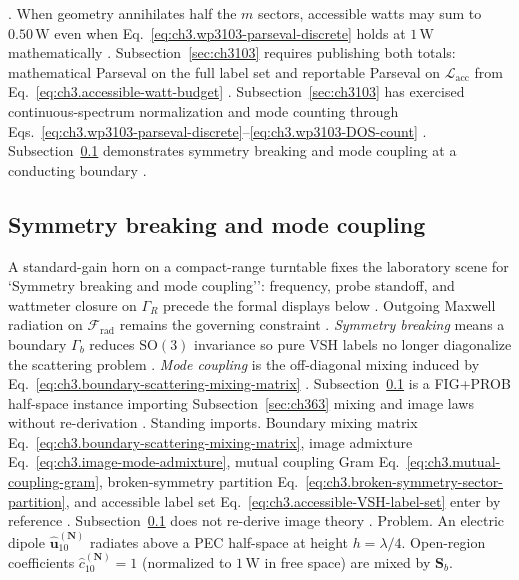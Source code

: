 \cite{hansen1988}.
When geometry annihilates half the \(m\) sectors, accessible watts may sum to \(0.50\,\mathrm{W}\) even when Eq.~\eqref{eq:ch3.wp3103-parseval-discrete} holds at \(1\,\mathrm{W}\) mathematically
\cite{harrington2001}. Subsection~\ref{sec:ch3103} requires publishing both totals: mathematical Parseval on the full label set and reportable Parseval on \(\mathcal{L}_{\mathrm{acc}}\) from Eq.~\eqref{eq:ch3.accessible-watt-budget}
\cite{hansen1988}.
Subsection~\ref{sec:ch3103} has exercised continuous-spectrum normalization and mode counting through
Eqs.~\eqref{eq:ch3.wp3103-parseval-discrete}--\eqref{eq:ch3.wp3103-DOS-count}
\cite{stratton1941}. Subsection~\ref{sec:ch3104} demonstrates symmetry breaking and mode coupling at a conducting
boundary \cite{jackson1999}.
\subsection{Symmetry breaking and mode coupling}
\label{sec:ch3104}
A standard-gain horn on a compact-range turntable fixes the laboratory scene for `Symmetry breaking and mode coupling'': frequency, probe standoff, and wattmeter closure on $\Gamma_R$ precede the formal displays below \cite{hansen1988}. Outgoing Maxwell radiation on $\mathcal{F}_{\mathrm{rad}}$ remains the governing constraint \cite{stratton1941}.
\emph{Symmetry breaking} means a boundary \(\Gamma_{b}\) reduces \(\mathrm{SO}(3)\) invariance so pure VSH labels no longer diagonalize the
scattering problem \cite{stratton1941}. \emph{Mode coupling} is the off-diagonal mixing induced by
Eq.~\eqref{eq:ch3.boundary-scattering-mixing-matrix} \cite{hansen1988}. Subsection~\ref{sec:ch3104} is a FIG+PROB half-space
instance importing Subsection~\ref{sec:ch363} mixing and image laws without re-derivation \cite{stratton1941}.
Standing imports. Boundary mixing matrix Eq.~\eqref{eq:ch3.boundary-scattering-mixing-matrix}, image admixture Eq.~\eqref{eq:ch3.image-mode-admixture},
mutual coupling Gram Eq.~\eqref{eq:ch3.mutual-coupling-gram}, broken-symmetry partition Eq.~\eqref{eq:ch3.broken-symmetry-sector-partition},
and accessible label set Eq.~\eqref{eq:ch3.accessible-VSH-label-set} enter by reference \cite{harrington2001}. Subsection~\ref{sec:ch3104}
does not re-derive image theory \cite{jackson1999}.
Problem. An electric dipole \(\widehat{\mathbf{u}}_{10}^{(\mathbf{N})}\) radiates above a PEC half-space at height \(h=\lambda/4\). Open-region
coefficients \(\widehat{c}_{10}^{(\mathbf{N})}=1\) (normalized to \(1\,\mathrm{W}\) in free space) are mixed by \(\mathbf{S}_{b}\).
